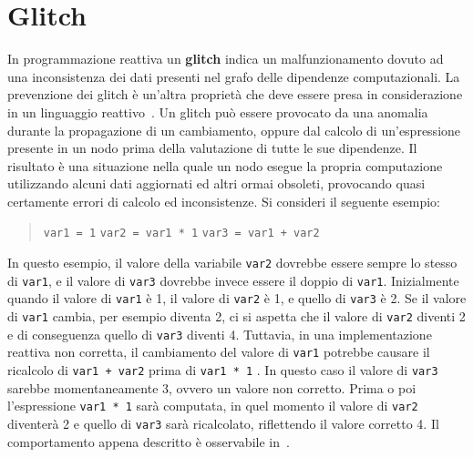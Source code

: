 \documentclass[12pt,a4paper,openright,twoside]{book}
\begin{document}
\section{Glitch}
\label{sec:glitch}
In programmazione reattiva un \textbf{glitch} indica un malfunzionamento dovuto ad una inconsistenza dei dati presenti nel grafo delle dipendenze computazionali. La prevenzione dei glitch è un'altra proprietà che deve essere presa in considerazione in un linguaggio reattivo~\cite{DBLP:journals/csur/BainomugishaCCMM13}.
Un glitch può essere provocato da una anomalia durante la propagazione di un cambiamento, oppure dal calcolo di un'espressione presente in un nodo prima della valutazione di tutte le sue dipendenze. Il risultato è una situazione nella quale un nodo esegue la propria computazione utilizzando alcuni dati aggiornati ed altri ormai obsoleti, provocando quasi certamente errori di calcolo ed inconsistenze. 
Si consideri il seguente esempio: 
\begin{quotation}\noindent
    \texttt{var1 = 1}\newline
    \texttt{var2 = var1 * 1}\newline
    \texttt{var3 = var1 + var2}
\end{quotation} 
In questo esempio, il valore della variabile \texttt{var2} dovrebbe essere sempre lo stesso di \texttt{var1}, e il valore di \texttt{var3} dovrebbe invece essere il doppio di \texttt{var1}. Inizialmente quando il valore di \texttt{var1} è 1, il valore di \texttt{var2} è 1, e quello di \texttt{var3} è 2. Se il valore di \texttt{var1} cambia, per esempio diventa 2, ci si aspetta che il valore di \texttt{var2} diventi 2 e di conseguenza quello di \texttt{var3} diventi 4. Tuttavia, in una implementazione reattiva non corretta, il cambiamento del valore di \texttt{var1} potrebbe causare il ricalcolo di \texttt{var1 + var2} prima di \texttt{var1 * 1} . In questo caso il valore di \texttt{var3} sarebbe momentaneamente 3, ovvero un valore non corretto.
Prima o poi l'espressione \texttt{var1 * 1} sarà computata, in quel momento il valore di \texttt{var2} diventerà 2 e quello di \texttt{var3} sarà ricalcolato, riflettendo il valore corretto 4. Il comportamento appena descritto è osservabile in~.
\end{document}

